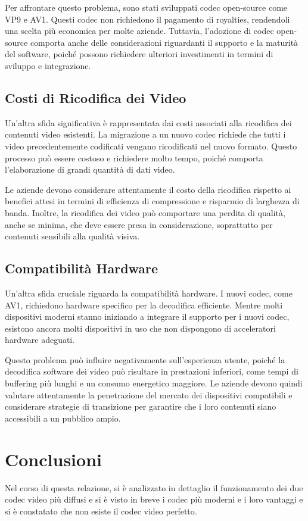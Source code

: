 \documentclass[a4paper,12pt, oneside]{article}
\begin{document}
Per affrontare questo problema, sono stati sviluppati codec open-source come VP9 e AV1. Questi
codec non richiedono il pagamento di royalties, rendendoli una scelta più economica per molte
aziende. Tuttavia, l'adozione di codec open-source comporta anche delle considerazioni riguardanti
il supporto e la maturità del software, poiché possono richiedere ulteriori investimenti in termini
di sviluppo e integrazione.

\subsection{Costi di Ricodifica dei Video}
Un'altra sfida significativa è rappresentata dai costi associati alla ricodifica dei contenuti
video esistenti. La migrazione a un nuovo codec richiede che tutti i video precedentemente
codificati vengano ricodificati nel nuovo formato. Questo processo può essere costoso e richiedere
molto tempo, poiché comporta l'elaborazione di grandi quantità di dati video.

Le aziende devono considerare attentamente il costo della ricodifica rispetto ai benefici attesi
in termini di efficienza di compressione e risparmio di larghezza di banda. Inoltre, la ricodifica
dei video può comportare una perdita di qualità, anche se minima, che deve essere presa in considerazione,
soprattutto per contenuti sensibili alla qualità visiva.

\subsection{Compatibilità Hardware}
Un'altra sfida cruciale riguarda la compatibilità hardware. I nuovi codec, come AV1, richiedono
hardware specifico per la decodifica efficiente. Mentre molti dispositivi moderni stanno iniziando a
integrare il supporto per i nuovi codec, esistono ancora molti dispositivi in uso che non dispongono
di acceleratori hardware adeguati.

Questo problema può influire negativamente sull'esperienza utente, poiché la decodifica software dei
video può risultare in prestazioni inferiori, come tempi di buffering più lunghi e un consumo energetico
maggiore. Le aziende devono quindi valutare attentamente la penetrazione del mercato dei dispositivi
compatibili e considerare strategie di transizione per garantire che i loro contenuti siano accessibili
a un pubblico ampio.

\section{Conclusioni}
Nel corso di questa relazione, si è analizzato in dettaglio il funzionamento dei due codec video più
diffusi e si è visto in breve i codec più moderni e i loro vantaggi e si è constatato che non esiste
il codec video perfetto.
\end{document}
